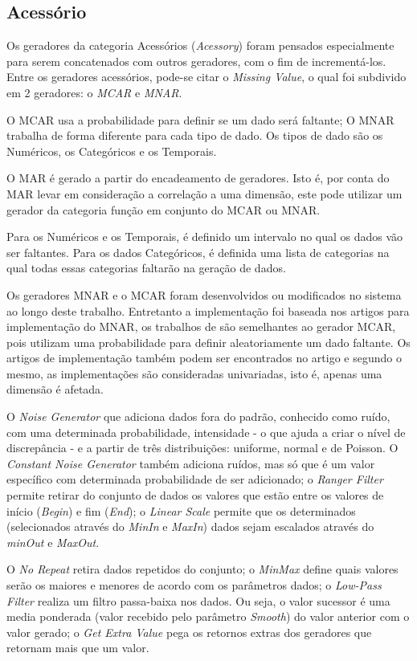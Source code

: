 \documentclass[
	12pt,				%
	openright,			%
	oneside,			%
	a4paper,			%
	english,			%
	brazil				%
	]{abntex2}
\begin{document}
		\subsection{Acessório}
			Os geradores da categoria Acessórios (\emph{Acessory}) foram pensados especialmente para serem concatenados com outros geradores, com o fim de incrementá-los.
			Entre os geradores acessórios, pode-se citar o \emph{Missing Value}, o qual foi subdivido em 2 geradores: o \emph{MCAR} e \emph{MNAR}.
			\par
			O MCAR usa a probabilidade para definir se um dado será faltante;
			O MNAR trabalha de forma diferente para cada tipo de dado.
			Os tipos de dado são os Numéricos, os Categóricos e os Temporais.
			\par
			O MAR é gerado a partir do encadeamento de geradores.
			Isto é, por conta do MAR levar em consideração a correlação a uma dimensão,
			este pode utilizar um gerador da categoria função em conjunto do MCAR ou MNAR.
			\par
			Para os Numéricos e os Temporais, é definido um intervalo no qual os dados vão ser faltantes.
			Para os dados Categóricos, é definida uma lista de categorias na qual todas essas categorias faltarão na geração de dados.
			\par
			 Os geradores MNAR e o MCAR foram desenvolvidos ou modificados no sistema ao longo deste trabalho.
			 Entretanto a implementação foi baseada nos artigos \cite{twala2009empirical} \cite{xia2017adjusted} para implementação do MNAR,
			 os trabalhos de \cite{rieger2010random} \cite{xia2017adjusted} são semelhantes ao gerador MCAR, pois utilizam uma probabilidade para definir aleatoriamente um dado faltante.
			 Os artigos de implementação também podem ser encontrados no artigo \cite{santos2019generating} e segundo o mesmo, as implementações são consideradas univariadas, isto é, apenas uma dimensão é afetada.
			  
			\par
				O \emph{Noise Generator} que adiciona dados fora do padrão, conhecido como ruído, com uma determinada probabilidade, intensidade - o que ajuda a criar o nível de discrepância - e a partir de três distribuições: uniforme, normal e de Poisson.
				O \emph{Constant Noise Generator} também adiciona ruídos, mas só que é um valor específico com determinada probabilidade de ser adicionado;
				o \emph{Ranger Filter} permite retirar do conjunto de dados os valores que estão entre os valores de início (\emph{Begin}) e fim (\emph{End});
				o \emph{Linear Scale} permite que os determinados (selecionados através do \emph{MinIn} e \emph{MaxIn}) dados sejam escalados através do \emph{minOut} e \emph{MaxOut}.
			\par
			O \emph{No Repeat} retira dados repetidos do conjunto;
				o \emph{MinMax} define quais valores serão os maiores e menores de acordo com os parâmetros dados;
				o \emph{Low-Pass Filter} realiza um filtro passa-baixa nos dados. Ou seja, o valor sucessor é uma media ponderada (valor recebido pelo parâmetro \emph{Smooth}) do valor anterior com o valor gerado;
				o \emph{Get Extra Value} pega os retornos extras dos geradores que retornam mais que um valor.
\end{document}
